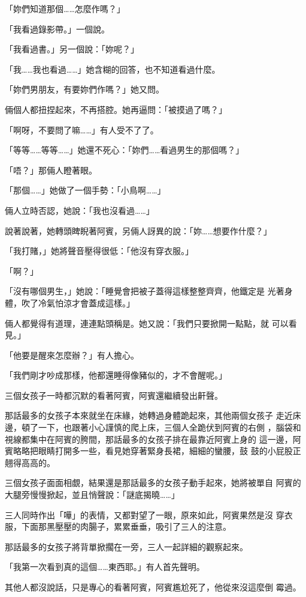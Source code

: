「妳們知道那個……怎麼作嗎？」

「我看過錄影帶。」一個說。

「我看過書。」另一個說：「妳呢？」

「我……我也看過……」她含糊的回答，也不知道看過什麼。

「妳們男朋友，有要妳們作嗎？」她又問。

倆個人都扭捏起來，不再搭腔。她再逼問：「被摸過了嗎？」

「啊呀，不要問了嘛……」有人受不了了。

「等等……等等……」她還不死心：「妳們……看過男生的那個嗎？」

「唔？」那倆人瞪著眼。

「那個……」她做了一個手勢：「小鳥啊……」

倆人立時否認，她說：「我也沒看過……」

說著說著，她轉頭睥睨著阿賓，另倆人訝異的說：「妳……想要作什麼？」

「我打賭，」她將聲音壓得很低：「他沒有穿衣服。」

「啊？」

「沒有哪個男生，」她說：「睡覺會把被子蓋得這樣整整齊齊，他鐵定是
光著身體，吹了冷氣怕涼才會蓋成這樣。」

倆人都覺得有道理，連連點頭稱是。她又說：「我們只要掀開一點點，就
可以看見。」

「他要是醒來怎麼辦？」有人擔心。

「我們剛才吵成那樣，他都還睡得像豬似的，才不會醒呢。」

三個女孩子一時都沉默的看著阿賓，阿賓還繼續發出鼾聲。

那話最多的女孩子本來就坐在床緣，她轉過身體跪起來，其他兩個女孩子
走近床邊，頓了一下，也跟著小心謹慎的爬上床，三個人全跪伏到阿賓的右側
，腦袋和視線都集中在阿賓的胯間，那話最多的女孩子排在最靠近阿賓上身的
這一邊，阿賓略略把眼睛打開多一些，看見她穿著緊身長裙，細細的蠻腰，鼓
鼓的小屁股正翹得高高的。

三個女孩子面面相覷，結果還是那話最多的女孩子動手起來，她將被單自
阿賓的大腿旁慢慢掀起，並且悄聲說：「謎底揭曉……」

三人同時作出「嘩」的表情，又都對望了一眼，原來如此，阿賓果然是沒
穿衣服，下面那黑壓壓的肉腸子，累累垂垂，吸引了三人的注意。

那話最多的女孩子將背單掀擱在一旁，三人一起詳細的觀察起來。

「我第一次看到真的這個……東西耶。」有人首先聲明。

其他人都沒說話，只是專心的看著阿賓，阿賓尷尬死了，他從來沒這麼倒
霉過。

